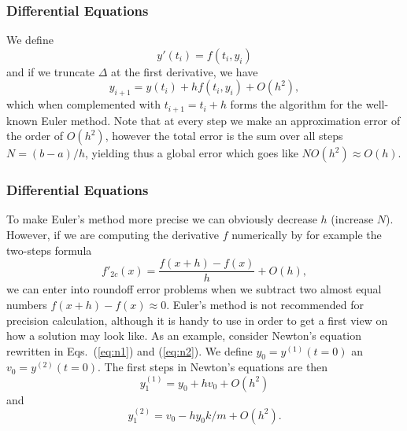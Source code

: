 \documentclass{beamer}
\begin{document}
\begin{frame}
\frametitle{Differential Equations}

\begin{block}{}
We define 
\begin{equation}
  y'(t_i)=f(t_i,y_i)   
\end{equation}
and if we truncate $\Delta$ at the first derivative, we have
\begin{equation}
   y_{i+1}=y(t_i) + hf(t_i,y_i) + O(h^2), \label{eq:euler}
\end{equation}
which when complemented with $t_{i+1}=t_i+h$ forms
the algorithm for the well-known Euler method. 
Note that at every step we make an approximation error
of the order of $O(h^2)$, however the total error is the sum over all
steps $N=(b-a)/h$, yielding thus a global error which goes like
$NO(h^2)\approx O(h)$. 
\end{block}
\end{frame}

\begin{frame}
\frametitle{Differential Equations}

\begin{block}{}
To make Euler's method more precise we can obviously
decrease $h$ (increase $N$). However, if we are computing the 
derivative $f$ numerically  
by for example the two-steps formula
\[
    f'_{2c}(x)= \frac{f(x+h)-f(x)}{h}+O(h),
\]
we can enter into roundoff error problems when we subtract 
two almost equal numbers $f(x+h)-f(x)\approx 0$. 
Euler's method is not recommended for precision calculation,
although it is handy to use in order to get a first
view on how a solution may look like. As an example,
consider Newton's equation rewritten in Eqs.~(\ref{eq:n1}) and (\ref{eq:n2}). We define $y_0=y^{(1)}(t=0)$
an $v_0=y^{(2)}(t=0)$. The first steps in Newton's equations
are then
\begin{equation} 
   y^{(1)}_1=y_0+hv_0+O(h^2)
\end{equation}
and 
\begin{equation}
      y^{(2)}_1=v_0-hy_0k/m+O(h^2).
\end{equation}
\end{block}
\end{frame}
\end{document}
